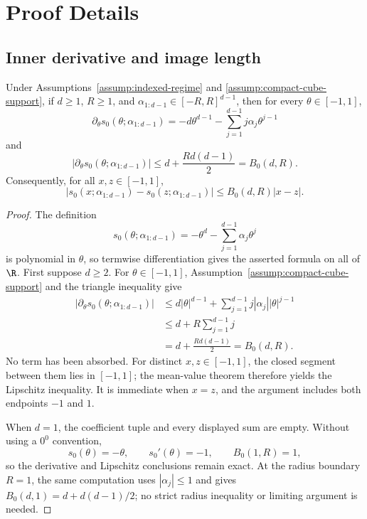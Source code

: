 \appendix

\section{Proof Details}

\subsection{Inner derivative and image length}
\label{app:inner-certificate}

\begin{lemma}
\label{lem:inner-derivative}
Under Assumptions~\ref{assump:indexed-regime} and
\ref{assump:compact-cube-support}, if $d\geq1$, $R\geq1$, and
$\alpha_{1:d-1}\in[-R,R]^{d-1}$, then for every $\theta\in[-1,1]$,
\[
\partial_\theta s_0(\theta;\alpha_{1:d-1})
=-d\theta^{d-1}-\sum_{j=1}^{d-1}j\alpha_j\theta^{j-1}
\]
and
\[
\bigl|\partial_\theta s_0(\theta;\alpha_{1:d-1})\bigr|
\leq d+\frac{Rd(d-1)}2=B_0(d,R).
\]
Consequently, for all $x,z\in[-1,1]$,
\[
|s_0(x;\alpha_{1:d-1})-s_0(z;\alpha_{1:d-1})|
\leq B_0(d,R)|x-z|.
\]
\end{lemma}

\begin{proof}
The definition
\[
s_0(\theta;\alpha_{1:d-1})
=-\theta^d-\sum_{j=1}^{d-1}\alpha_j\theta^j
\]
is polynomial in $\theta$, so termwise differentiation gives the asserted
formula on all of $\R$.  First suppose $d\geq2$.  For
$\theta\in[-1,1]$, Assumption~\ref{assump:compact-cube-support} and the
triangle inequality give
\[
\begin{aligned}
\bigl|\partial_\theta s_0(\theta;\alpha_{1:d-1})\bigr|
&\leq d|\theta|^{d-1}
 +\sum_{j=1}^{d-1}j|\alpha_j||\theta|^{j-1}\\
&\leq d+R\sum_{j=1}^{d-1}j\\
&=d+\frac{Rd(d-1)}2
=B_0(d,R).
\end{aligned}
\]
No term has been absorbed.  For distinct $x,z\in[-1,1]$, the closed segment
between them lies in $[-1,1]$; the mean-value theorem therefore yields the
Lipschitz inequality.  It is immediate when $x=z$, and the argument includes
both endpoints $-1$ and $1$.

When $d=1$, the coefficient tuple and every displayed sum are empty.  Without
using a $0^0$ convention,
\[
s_0(\theta)=-\theta,\qquad s_0'(\theta)=-1,
\qquad B_0(1,R)=1,
\]
so the derivative and Lipschitz conclusions remain exact.  At the radius
boundary $R=1$, the same computation uses $|\alpha_j|\leq1$ and gives
$B_0(d,1)=d+d(d-1)/2$; no strict radius inequality or limiting argument is
needed.
\end{proof}

